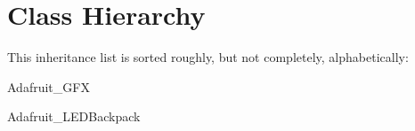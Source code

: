\section{Class Hierarchy}
This inheritance list is sorted roughly, but not completely, alphabetically\+:\begin{DoxyCompactList}
\item Adafruit\+\_\+\+G\+FX\begin{DoxyCompactList}
\item {}
\end{DoxyCompactList}
\item Adafruit\+\_\+\+L\+E\+D\+Backpack\begin{DoxyCompactList}
\item {}
\end{DoxyCompactList}
\item {}
\end{DoxyCompactList}
